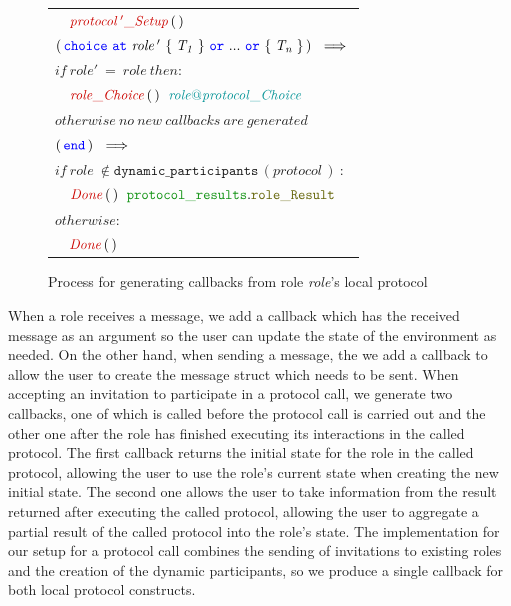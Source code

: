 \documentclass[12pt,twoside]{report}
\begin{document}
\begin{figure}[!h]
\begin{center}
\begin{tabular}{l}
            $\quad \functionname{protocol\,'\_Setup}\,(\,)$\\[15pt]

            $(\,\choice\ \at\ \mathit{role\,'}\ \{\;\mathit{T_1}\;\}\ \scror\ ...\ \scror\ \{\;\mathit{T_n}\;\}\,)\ \implies$\\[6pt]
            $\mathit{if\ role'\ =\ role\ then:}$\\[4pt]
            
            $\quad \functionname{role\_Choice}\,(\,)\;\ \enumtype{\localprotocol{role}{protocol}\_Choice}$\\[6pt]
            $\mathit{otherwise\ no\ new\ callbacks\ are\ generated}$\\[15pt]

            $(\,\scrend\,)\ \implies$\\[3pt] 
            
            $\mathit{if\ \mathit{role}\ \notin \mathtt{dynamic\_participants\,}\mathit{(protocol\,)}\ :}$\\[4pt]
            
            $\quad \functionname{Done}\,(\,)\;\ \pkgstructaccess{protocol\_results}{role\_Result}$\\[6pt]
            
            $\mathit{otherwise:}$\\[4pt]
            
            $\quad \functionname{Done}\,(\,)$\\[15pt]

        \end{tabular}
    \end{center}
    \caption{Process for generating callbacks from role \textit{role}'s local protocol}
    \label{callbacks-gen}
\end{figure}

When a role receives a message, we add a callback which has the received message as an argument so the user can update the state of the environment as needed. On the other hand, when sending a message, the we add a callback to allow the user to create the message struct which needs to be sent. When accepting an invitation to participate in a protocol call, we generate two callbacks, one of which is called before the protocol call is carried out and the other one after the role has finished executing its interactions in the called protocol. The first callback returns the initial state for the role in the called protocol, allowing the user to use the role's current state when creating the new initial state. The second one allows the user to take information from the result returned after executing the called protocol, allowing the user to aggregate a partial result of the called protocol into the role's state. The implementation for our setup for a protocol call combines the sending of invitations to existing roles and the creation of the dynamic participants, so we produce a single callback for both local protocol constructs.
\end{document}
